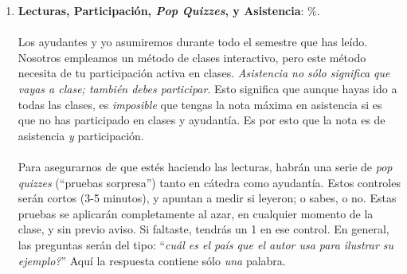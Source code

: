 \documentclass[letterpaper]{article}
\begin{document}
\begin{enumerate}

	\item {\bf Lecturas, Participaci\'on, \emph{Pop Quizzes}, y Asistencia}: {\unskip}\%.
	\\
	\\
	Los ayudantes y yo asumiremos durante todo el semestre que has le\'ido. Nosotros empleamos un m\'etodo de clases interactivo, pero este m\'etodo necesita de tu participaci\'on activa en clases. \emph{Asistencia no s\'olo significa que vayas a clase; tambi\'en debes participar}. Esto significa que aunque hayas ido a todas las clases, es \emph{imposible} que tengas la nota m\'axima en asistencia si es que no has participado en clases y ayudant\'ia. Es por esto que la nota es de asistencia \emph{y} participaci\'on.
\\
\\	
	Para asegurarnos de que est\'es haciendo las lecturas, habr\'an una serie de \emph{pop quizzes} (``pruebas sorpresa'') tanto en c\'atedra como ayudant\'ia. Estos controles ser\'an cortos (3-5 minutos), y apuntan a medir si leyeron; o sabes, o no. Estas pruebas se aplicar\'an completamente al azar, en cualquier momento de la clase, y sin previo aviso. Si faltaste, tendr\'as un 1 en ese control. En general, las preguntas ser\'an del tipo: ``\emph{cu\'al es el pa\'is que el autor usa para ilustrar su ejemplo?}'' Aqu\'i la respuesta contiene s\'olo \emph{una} palabra.
	\\

\end{enumerate}
\end{document}
